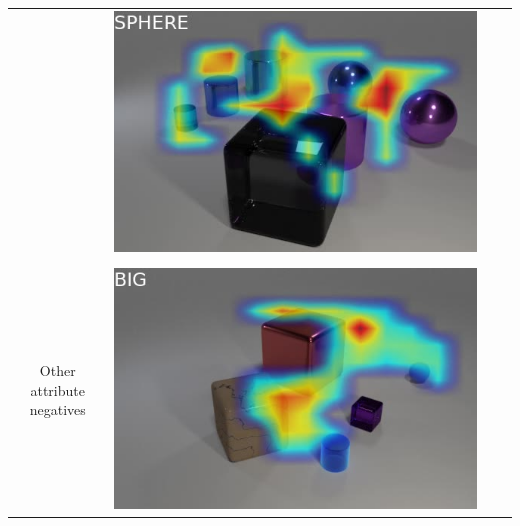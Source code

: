 \begin{table}
\begin{tabular}{@{}cccc@{}}
\begin{minipage}{.2\textwidth}
    \end{minipage}
    &
    \begin{minipage}{.2\textwidth}
      \includegraphics[width=\linewidth]{figures/CLEVR_activations/sphere_negimage01.jpg}
    \end{minipage}
\\ \\
\makecell{Other attribute \\ negatives} &
    \begin{minipage}{.2\textwidth}
      \includegraphics[width=\linewidth]{figures/CLEVR_activations/big_shape01.jpg}
    \end{minipage}
    &
        \begin{minipage}{.2\textwidth}

\end{minipage}
\end{tabular}
\end{table}
